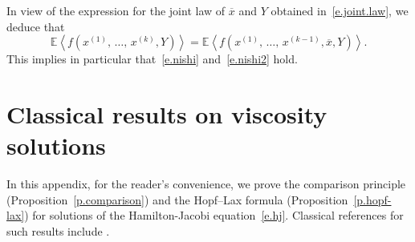 \documentclass[AHL,Unicode,longabstracts,published]{cedram}
\newcommand{\E}{\mathbb{E}}
\newcommand{\1}{\mathds{1}}
\newcommand{\la}{\left\langle}
\newcommand{\ra}{\right\rangle}
\renewcommand{\bar}{\overline}
\begin{document}
In view of the expression for the joint law of $\bar x$ and $Y$ obtained in~\eqref{e.joint.law}, we deduce that
\begin{equation}\label{e.real.Nishi}
\E \la f\left(x^{(1)},\,\ldots,\,x^{(k)},Y\right) \ra = \E \la f\left(x^{(1)},\,\ldots,\,x^{(k-1)},\bar x,Y\right) \ra.
\end{equation}
This implies in particular that~\eqref{e.nishi} and~\eqref{e.nishi2} hold.



\section{Classical results on viscosity solutions}\label{s.visc}

In this appendix, for the reader's convenience, we prove the comparison principle (Proposition~\ref{p.comparison}) and the Hopf--Lax formula (Proposition~\ref{p.hopf-lax}) for solutions of the Hamilton-Jacobi equation~\eqref{e.hj}. Classical references for such results include \cite{evans,guide}.
\end{document}
